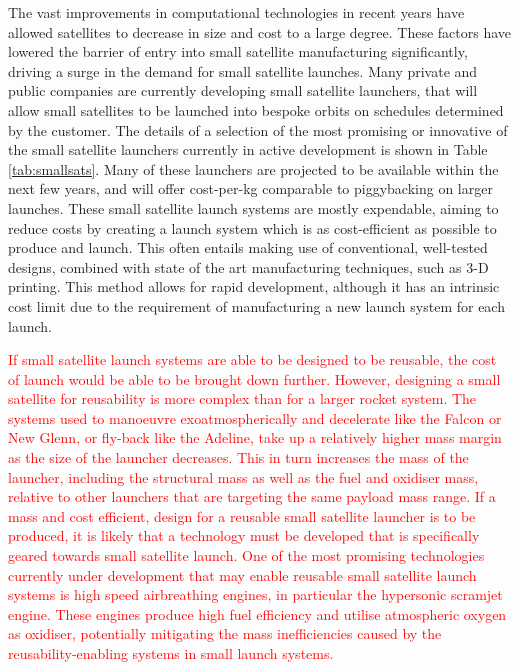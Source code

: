     
    The vast improvements in computational technologies in recent years have allowed satellites to decrease in size and cost to a large degree. These factors have lowered the barrier of entry into small satellite manufacturing significantly, driving a surge in the demand for small satellite launches. Many private and public companies are currently developing small satellite launchers, that will allow small satellites to be launched into bespoke orbits on schedules determined by the customer\cite{Faa2018}. The details of a selection of the most promising or innovative of the small satellite launchers currently in active development is shown in Table \ref{tab:smallsats}. Many of these launchers are projected to be available within the next few years, and will offer cost-per-kg comparable to piggybacking on larger launches.
    These small satellite launch systems are mostly expendable, aiming to reduce costs by creating a launch system which is as cost-efficient as possible to produce and launch\cite{Niederstrasser2015}. This often entails making use of conventional, well-tested designs, combined with state of the art manufacturing techniques, such as 3-D printing\cite{Niederstrasser2015,Gilmour}. This method allows for rapid development, although it has an intrinsic cost limit due to the requirement of manufacturing a new launch system for each launch. 
    
    \textcolor{red}{If small satellite launch systems are able to be designed to be reusable, the cost of launch would be able to be brought down further. However, designing a small satellite for reusability is more complex than for a larger rocket system. The systems used to manoeuvre exoatmospherically and decelerate like the Falcon or New Glenn, or fly-back like the Adeline, take up a relatively higher mass margin as the size of the launcher decreases. This in turn increases the mass of the launcher, including the structural mass as well as the fuel and oxidiser mass, relative to other launchers that are targeting the same payload mass range. If a mass and cost efficient, design for a reusable small satellite launcher is to be produced, it is likely that a technology must be developed that is specifically geared towards small satellite launch. 
    One of the most promising technologies currently under development that may enable reusable small satellite launch systems is high speed airbreathing engines\cite{Smart2009}, in particular the hypersonic scramjet engine. These engines produce high fuel efficiency and utilise atmospheric oxygen as oxidiser, potentially mitigating the mass inefficiencies caused by the reusability-enabling systems in small launch systems.}
    
